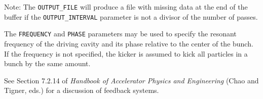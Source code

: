 Note: The \verb|OUTPUT_FILE| will produce a file with missing data at the end of
the buffer if the \verb|OUTPUT_INTERVAL| parameter is not a divisor of the number of passes.

The \verb|FREQUENCY| and \verb|PHASE| parameters may be used to specify the resonant frequency of 
the driving cavity and its phase relative to the center of the bunch.
If the frequency is not specified, the kicker is assumed to kick all particles in a bunch by the
same amount.

See Section 7.2.14 of {\em Handbook of Accelerator Physics and Engineering}
(Chao and Tigner, eds.) for a discussion of feedback systems.
